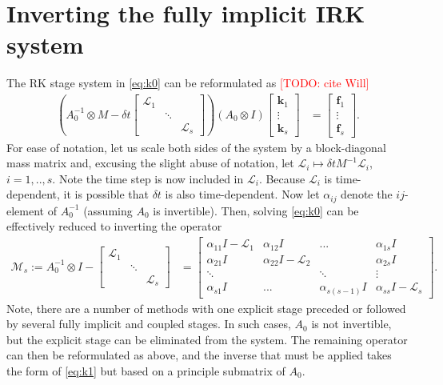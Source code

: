 \documentclass[a4paper,10pt]{article}
\makeatletter
\newcommand{\todo}[1]{\textcolor{red}{[TODO\@: #1]}}
\makeatother
\begin{document}
\section{Inverting the fully implicit IRK system}

The RK stage system in \eqref{eq:k0} can be reformulated as \todo{cite Will}
%
\begin{align*}
\left( A_0^{-1}\otimes M - \delta t \begin{bmatrix} \mathcal{L}_1  & \\ & \ddots \\ && \mathcal{L}_s\end{bmatrix}\right)
	(A_0\otimes I)	\begin{bmatrix} \mathbf{k}_1 \\ \vdots \\ \mathbf{k}_s \end{bmatrix} 
& = \begin{bmatrix} \mathbf{f}_1 \\ \vdots \\ \mathbf{f}_s \end{bmatrix}.
\end{align*}
%
For ease of notation, let us scale both sides of the system by a block-diagonal mass matrix 
and, excusing the slight abuse of notation, let $\mathcal{L}_i \mapsto \delta t M^{-1}\mathcal{L}_i$,
$i=1,..,s$. Note the time step is now included in $\mathcal{L}_i$. Because $\mathcal{L}_i$ is
time-dependent, it is possible that $\delta t$ is also time-dependent.
Now let $\alpha_{ij}$ denote the $ij$-element of $A_0^{-1}$ (assuming $A_0$ is
invertible). Then, solving \eqref{eq:k0} can be effectively reduced to inverting the operator
%
\begin{align}\label{eq:k1}
\mathcal{M}_s := A_0^{-1}\otimes I - \begin{bmatrix} \mathcal{L}_1  & \\ & \ddots \\ && \mathcal{L}_s\end{bmatrix}
	& = 
\begin{bmatrix} \alpha_{11}I - \mathcal{L}_1 & \alpha_{12}I & ... & \alpha_{1s}I \\
	\alpha_{21}I & \alpha_{22}I - \mathcal{L}_2 & & \alpha_{2s}I \\
	\ddots & & \ddots & \vdots \\ \alpha_{s1}I & ... & \alpha_{s(s-1)}I & \alpha_{ss}I - \mathcal{L}_s \end{bmatrix}.
\end{align}
%
Note, there are a number of methods with one explicit stage preceded or followed by several
fully implicit and coupled stages. In such cases, $A_0$ is
not invertible, but the explicit stage can be eliminated from the system. The remaining operator
can then be reformulated as above, and the inverse that must be applied takes the form of
\eqref{eq:k1} but based on a principle submatrix of $A_0$.
\end{document}
